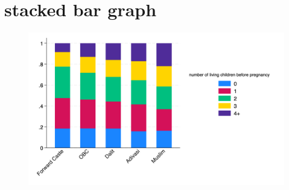 \documentclass{article}
\begin{document}
\section{stacked bar graph}
\begin{figure}[H]
    \centering
    \includegraphics[width=\textwidth]{figures/stackedbar_parity_socialgroup.png}
\end{figure}
\end{document}
